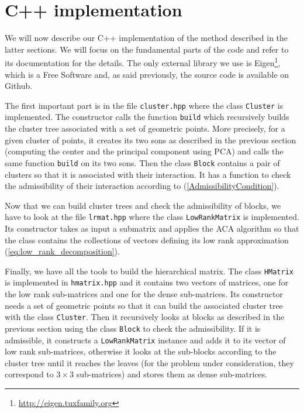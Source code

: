 


\section{C++ implementation}

We will now describe our C++ implementation of the method described in the latter sections. We will focus on the fundamental parts of the code and refer to its documentation for the details. The only external library we use is Eigen\footnote{\url{http://eigen.tuxfamily.org}}, which is a Free Software and, as said previously, the source code is available on Github. 

The first important part is in the file \texttt{cluster.hpp} where the class \texttt{Cluster} is implemented. The constructor calls the function \texttt{build} which recursively builds the cluster tree associated with a set of geometric points. More precisely, for a given cluster of points, it creates its two sons as described in the previous section (computing the center and the principal component using PCA) and calls the same function \texttt{build} on its two sons. Then the class \texttt{Block} contains a pair of clusters so that it is associated with their interaction. It has a function to check the admissibility of their interaction according to (\ref{AdmissibilityCondition}).

Now that we can build cluster trees and check the admissibility of blocks, we have to look at the file \texttt{lrmat.hpp} where the class \texttt{LowRankMatrix} is implemented. Its constructor takes as input a submatrix and applies the ACA algorithm so that the class contains the collections of vectors defining its low rank approximation (\ref{eq:low_rank_decomposition}).

Finally, we have all the tools to build the hierarchical matrix. The class \texttt{HMatrix} is implemented in \texttt{hmatrix.hpp} and it contains two vectors of matrices, one for the low rank sub-matrices and one for the dense sub-matrices. Its constructor needs a set of geometric points so that it can build the associated cluster tree with the class \texttt{Cluster}. Then it recursively looks at blocks as described in the previous section using the class \texttt{Block} to check the admissibility. If it is admissible, it constructs a \texttt{LowRankMatrix} instance and adds it to its vector of low rank sub-matrices, otherwise it looks at the sub-blocks according to the cluster tree until it reaches the leaves (for the problem under consideration, they correspond to $3 \times 3$ sub-matrices) and stores them as dense sub-matrices.

